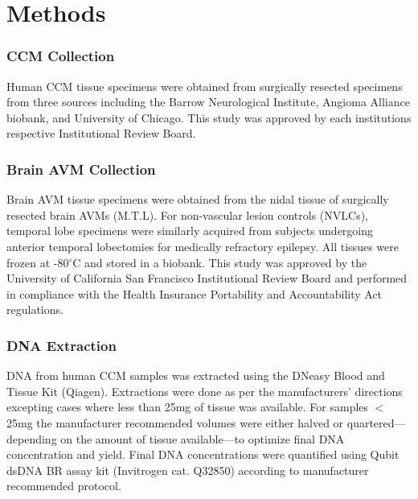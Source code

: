 \section{Methods}
\subsubsection{CCM Collection}
Human CCM tissue specimens were obtained from surgically resected specimens from three sources including the Barrow Neurological Institute, Angioma Alliance biobank, and University of Chicago. This study was approved by each institutions respective Institutional Review Board. 

\subsubsection{Brain AVM Collection}
Brain AVM tissue specimens were obtained from the nidal tissue of surgically resected brain AVMs (M.T.L). For non-vascular lesion controls (NVLCs), temporal lobe specimens were similarly acquired from subjects undergoing anterior temporal lobectomies for medically refractory epilepsy. All tissues were frozen at -80$^{\circ}$C and stored in a biobank. This study was approved by the University of California San Francisco Institutional Review Board and performed in compliance with the Health Insurance Portability and Accountability Act regulations.

\subsubsection{DNA Extraction}
DNA from human CCM samples was extracted using the DNeasy Blood and Tissue Kit (Qiagen). Extractions were done as per the manufacturers’ directions excepting cases where less than 25mg of tissue was available. For samples $<$25mg the manufacturer recommended volumes were either halved or quartered---depending on the amount of tissue available---to optimize final DNA concentration and yield. Final DNA concentrations were quantified using Qubit dsDNA BR assay kit (Invitrogen cat. Q32850) according to manufacturer recommended protocol. 

